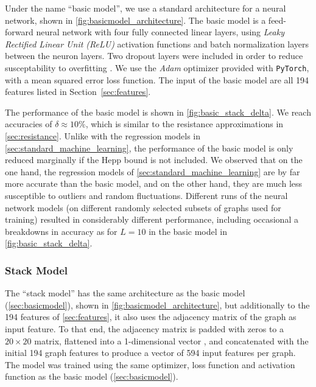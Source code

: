 \documentclass[11pt]{scrartcl}
\numberwithin{equation}{section}
\begin{document}
Under the name \enquote{basic model}, we use a standard architecture for a neural network, shown in \cref{fig:basicmodel_architecture}. The basic model is a feed-forward neural network with four fully connected linear layers, using \emph{Leaky Rectified Linear Unit (ReLU)} activation functions and batch normalization layers between the neuron layers. Two dropout layers were included in order to reduce susceptability to overfitting \cite{goodfellow_deep_2016}. We use the \emph{Adam} \cite{kingma_adam_2014} optimizer provided with \texttt{PyTorch}, with a mean squared error loss function. The input of the basic model are  all 194 features listed in Section~\ref{sec:features}.



The performance of the basic model is shown in \cref{fig:basic_stack_delta}. We reach accuracies of $\delta \approx 10\%$, which is similar to the resistance approximations in \cref{sec:resistance}. 
 Unlike with the regression models in \cref{sec:standard_machine_learning}, the performance of the basic model is only reduced marginally if the Hepp bound is not included. 
We observed that on the one hand, the regression models of \cref{sec:standard_machine_learning} are by far more accurate than the basic model, and on the other hand, they are much less susceptible to outliers and random fluctuations. Different runs of the neural network models (on different randomly selected subsets of graphs used for training) resulted in considerably different performance, including occasional a breakdowns in accuracy as for $L=10$ in the basic model in \cref{fig:basic_stack_delta}. 
 






\subsubsection{Stack Model}\label{sec:stackmodel}
The \enquote{stack model} has the same architecture as the basic model (\cref{sec:basicmodel}), shown in \cref{fig:basicmodel_architecture}, but additionally to the 194 features of \cref{sec:features}, it also  uses  the adjacency  matrix of the graph  as input feature. To that end, the adjacency matrix is padded with zeros to a $20\times 20$ matrix,  flattened into a 1-dimensional vector \cite{goyal_graph_2018}, and concatenated with the initial 194 graph features to produce a vector of 594 input features per graph. The model was trained using the same optimizer, loss function and activation function as the basic model (\cref{sec:basicmodel}).
\end{document}
